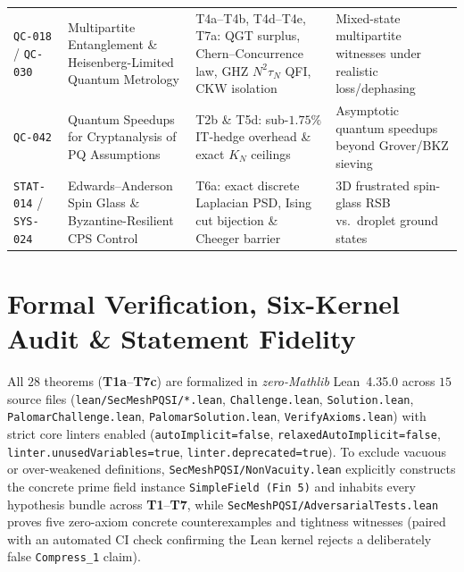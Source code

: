 \documentclass[11pt,reqno]{amsart}
\theoremstyle{definition}
\newcommand{\code}[1]{\texttt{\small #1}}
\begin{document}
\begin{table}[t]
\begin{tabularx}{\linewidth}{@{} >{\RaggedRight\arraybackslash}p{2.05cm} >{\RaggedRight\arraybackslash}p{4.05cm} Y Y@{}}
\code{QC-018} / \code{QC-030} & Multipartite Entanglement \& Heisenberg-Limited Quantum Metrology & T4a--T4b, T4d--T4e, T7a: QGT surplus, Chern--Concurrence law, GHZ $N^2\tau_N$ QFI, CKW isolation & Mixed-state multipartite witnesses under realistic loss/dephasing \\
\code{QC-042} & Quantum Speedups for Cryptanalysis of PQ Assumptions & T2b \& T5d: sub-$1.75\%$ IT-hedge overhead \& exact $K_N$ ceilings & Asymptotic quantum speedups beyond Grover/BKZ sieving \\
\code{STAT-014} / \code{SYS-024} & Edwards--Anderson Spin Glass \& Byzantine-Resilient CPS Control & T6a: exact discrete Laplacian PSD, Ising cut bijection \& Cheeger barrier & 3D frustrated spin-glass RSB vs.\ droplet ground states \\
\bottomrule
\end{tabularx}
\end{table}

\section{Formal Verification, Six-Kernel Audit \& Statement Fidelity}
\label{sec:formal}

All $28$ theorems (\textbf{T1a}--\textbf{T7c}) are formalized in \emph{zero-Mathlib} Lean~4.35.0 across $15$ source files (\code{lean/SecMeshPQSI/*.lean}, \code{Challenge.lean}, \code{Solution.lean}, \code{PalomarChallenge.lean}, \code{PalomarSolution.lean}, \code{VerifyAxioms.lean}) with strict core linters enabled (\code{autoImplicit=false}, \code{relaxedAutoImplicit=false}, \code{linter.unusedVariables=true}, \code{linter.deprecated=true}).
To exclude vacuous or over-weakened definitions, \code{SecMeshPQSI/NonVacuity.lean} explicitly constructs the concrete prime field instance \code{SimpleField (Fin 5)} and inhabits every hypothesis bundle across \textbf{T1}--\textbf{T7}, while \code{SecMeshPQSI/AdversarialTests.lean} proves five zero-axiom concrete counterexamples and tightness witnesses (paired with an automated CI check confirming the Lean kernel rejects a deliberately false \code{Compress\_1} claim).
\end{document}
